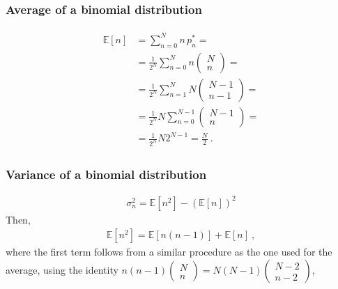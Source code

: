 \documentclass[letterpaper,10pt,english]{jupyterBook}
\begin{document}
\subsubsection*{Average of a binomial distribution}
\begin{equation*}
\begin{split}\begin{aligned}
  \mathbb{E}[n]
  & = \sum_{n=0}^{N} n \, p_n^* = \\
  & = \frac{1}{2^N} \sum_{n=0}^{N} n \left( \begin{matrix} N \\ n \end{matrix} \right) = \\
  & = \frac{1}{2^N} \sum_{n=1}^{N} N \left( \begin{matrix} N-1 \\ n-1 \end{matrix} \right) = \\
  & = \frac{1}{2^N} N \sum_{n=0}^{N-1} \left( \begin{matrix} N-1 \\ n \end{matrix} \right) = \\
  & = \frac{1}{2^N} N 2^{N-1} = \frac{N}{2} \ .
\end{aligned}\end{split}
\end{equation*}\subsubsection*{Variance of a binomial distribution}
\begin{equation*}
\begin{split}\sigma^2_n = \mathbb{E}[n^2] - \left( \mathbb{E}[n] \right)^2 \end{split}
\end{equation*}
\sphinxAtStartPar
Then,
\begin{equation*}
\begin{split}\mathbb{E}[n^2] = \mathbb{E}[n(n-1)] + \mathbb{E}[n] \ ,\end{split}
\end{equation*}
\sphinxAtStartPar
where the first term follows from a similar procedure as the one used for the average, using the identity \(n(n-1)\left(\begin{matrix} N \\n \end{matrix}\right) = N(N-1) \left( \begin{matrix} N-2 \\ n-2 \end{matrix} \right)\),
\end{document}
